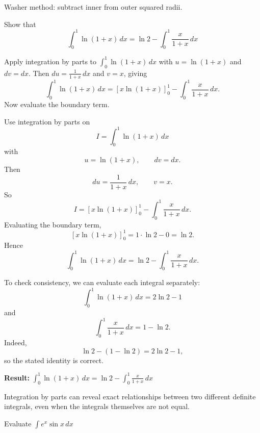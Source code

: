 \begin{takeaways}
Washer method: subtract inner from outer squared radii.
\end{takeaways}

\vspace{1cm}

\begin{problem}
Show that
\[
\int_0^1 \ln(1 + x) \, dx = \ln 2 - \int_0^1 \frac{x}{1 + x} \, dx
\]
\end{problem}

\begin{hint}
Apply integration by parts to $\int_0^1 \ln(1+x)\,dx$ with $u=\ln(1+x)$ and $dv=dx$. Then $du=\frac{1}{1+x}\,dx$ and $v=x$, giving
\[
\int_0^1 \ln(1+x)\,dx = [x\ln(1+x)]_0^1 - \int_0^1 \frac{x}{1+x}\,dx.
\]
Now evaluate the boundary term.
\end{hint}

\begin{solution}
Use integration by parts on
\[
I=\int_0^1 \ln(1+x)\,dx
\]
with
\[
u=\ln(1+x), \qquad dv=dx.
\]
Then
\[
du=\frac{1}{1+x}\,dx, \qquad v=x.
\]
So
\[
I=[x\ln(1+x)]_0^1-\int_0^1 \frac{x}{1+x}\,dx.
\]
Evaluating the boundary term,
\[
[x\ln(1+x)]_0^1 = 1\cdot \ln 2 - 0 = \ln 2.
\]
Hence
\[
\int_0^1 \ln(1+x)\,dx = \ln 2 - \int_0^1 \frac{x}{1+x}\,dx.
\]

To check consistency, we can evaluate each integral separately:
\[
\int_0^1 \ln(1+x)\,dx = 2\ln 2 - 1
\]
and
\[
\int_0^1 \frac{x}{1+x}\,dx = 1-\ln 2.
\]
Indeed,
\[
\ln 2 - (1-\ln 2)=2\ln 2 - 1,
\]
so the stated identity is correct.

\textbf{Result:} $\displaystyle \boxed{\int_0^1 \ln(1+x)\,dx = \ln 2 - \int_0^1 \frac{x}{1+x}\,dx}$
\end{solution}

\begin{takeaways}
Integration by parts can reveal exact relationships between two different definite integrals, even when the integrals themselves are not equal.
\end{takeaways}

\vspace{1cm}

\begin{problem}
Evaluate $\displaystyle \int e^x \sin x \, dx$
\end{problem}


